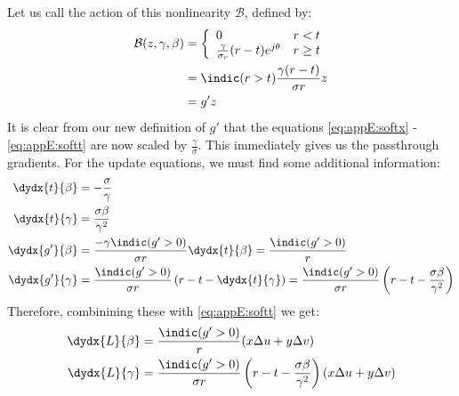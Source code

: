 Let us call the action of this nonlinearity $\mathcal{B}$, defined by:
\begin{align}
  \mathcal{B}(z, \gamma, \beta) &= \left\{ \begin{array}{ll}
      0 & r < t \\
      \frac{\gamma}{\sigma_r}(r-t)e^{j\theta} & r \geq t\\
  \end{array} 
\right. \\
&= \indic(r > t)\frac{\gamma (r-t)}{\sigma r} z\\
&= g'z
\end{align}
It is clear from our new definition of $g'$ that the equations
\eqref{eq:appE:softx} - \eqref{eq:appE:softt} are now 
scaled by $\frac{\gamma}{\sigma}$. 
This immediately gives us the passthrough gradients. For the update equations,
we must find some additional information:
\begin{align}
  \dydx{t}{\beta} &= -\frac{\sigma}{\gamma} \\
  \dydx{t}{\gamma} &= \frac{\sigma \beta}{\gamma^2} \\
  \dydx{g'}{\beta} &= \frac{-\gamma \indic(g' > 0)}{\sigma r} \dydx{t}{\beta} = \frac{\indic(g' > 0)}{r}  \\
  \dydx{g'}{\gamma} &= \frac{\indic(g' > 0)}{\sigma r}\left(r - t -\dydx{t}{\gamma}\right) = 
      \frac{\indic(g' > 0)}{\sigma r}\left(r - t - \frac{\sigma \beta}{\gamma^2}
      \right)  
\end{align}
Therefore, combinining these with \eqref{eq:appE:softt} we get:
\begin{align}
  \dydx{L}{\beta} &= \frac{\indic(g' > 0)}{r} (x\Delta u + y\Delta v) \\
  \dydx{L}{\gamma} &= \frac{\indic(g' > 0)}{\sigma r}\left(r - t - \frac{\sigma \beta}{\gamma^2}\right)(x\Delta u + y\Delta v) 
\end{align}


